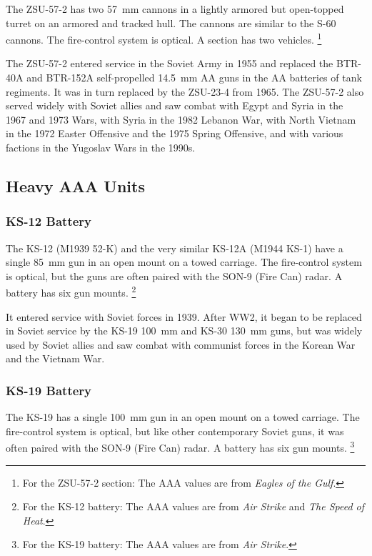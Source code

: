 \documentclass[10pt]{article}
\newcommand{\note}[1]{%
    \footnote{%
        \setlength{\parindent}{0pt}%
        \setlength{\parskip}{\smallskipamount}%
        #1
    }%
}
\begin{document}
The ZSU-57-2 has two 57~mm cannons in a lightly armored but open-topped turret on an armored and tracked hull. The cannons are similar to the S-60 cannons. The fire-control system is optical. A section has two vehicles.%
\note{
    For the ZSU-57-2 section: The AAA values are from \emph{Eagles of the Gulf}.
}

The ZSU-57-2 entered service in the Soviet Army in 1955 and replaced the BTR-40A and BTR-152A self-propelled 14.5~mm AA guns in the AA batteries of tank regiments. It was in turn replaced by the ZSU-23-4 from 1965. The ZSU-57-2 also served widely with Soviet allies and saw combat with Egypt and Syria in the 1967 and 1973 Wars, with Syria in the 1982 Lebanon War, with North Vietnam in the 1972 Easter Offensive and the 1975 Spring Offensive, and with various factions in the Yugoslav Wars in the 1990s.

\subsection{Heavy AAA Units}

\subsubsection{KS-12 Battery}

The KS-12 (M1939 52-K) and the very similar KS-12A (M1944 KS-1) have a single 85~mm gun in an open mount on a towed carriage. The fire-control system is optical, but the guns are often paired with the SON-9 (Fire Can) radar. A battery has six gun mounts.%
\note{
    For the KS-12 battery: The AAA values are from \emph{Air Strike} and \emph{The Speed of Heat}.
}

It entered service with Soviet forces in 1939. After WW2, it began to be replaced in Soviet service by the KS-19 100~mm and KS-30 130~mm guns, but was widely used by Soviet allies and saw combat with communist forces in the Korean War and the Vietnam War.

\subsubsection{KS-19 Battery}

The KS-19 has a single 100~mm gun in an open mount on a towed carriage. The fire-control system is optical, but like other contemporary Soviet guns, it was often paired with the SON-9 (Fire Can) radar. A battery has six gun mounts.%
\note{
    For the KS-19 battery: The AAA values are from \emph{Air Strike}.
}
\end{document}
